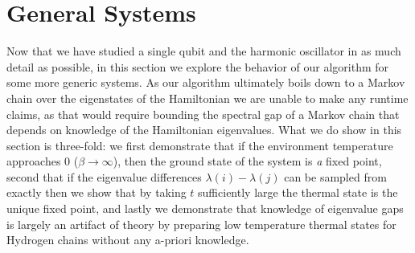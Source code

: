 \documentclass{article}
\begin{document}
\section{General Systems}
 Now that we have studied a single qubit and the harmonic oscillator in as much detail as possible, in this section we explore the behavior of our algorithm for some more generic systems. As our algorithm ultimately boils down to a Markov chain over the eigenstates of the Hamiltonian we are unable to make any runtime claims, as that would require bounding the spectral gap of a Markov chain that depends on knowledge of the Hamiltonian eigenvalues. What we do show in this section is three-fold: we first demonstrate that if the environment temperature approaches 0 ($\beta \to \infty$), then the ground state of the system is \emph{a} fixed point, second that if the eigenvalue differences $\lambda(i) - \lambda(j)$ can be sampled from exactly then we show that by taking $t$ sufficiently large the thermal state is the unique fixed point, and lastly we demonstrate that knowledge of eigenvalue gaps is largely an artifact of theory by preparing low temperature thermal states for Hydrogen chains without any a-priori knowledge.
 
\end{document}
